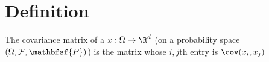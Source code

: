 

\section*{Definition}

The covariance matrix of a $x: \Omega  \to \R ^d$ (on a probability space $(\Omega , \mathcal{F} , \mathbfsf{P} )$) is the matrix whose $i,j$th entry is $\cov(x_i,x_j)$
